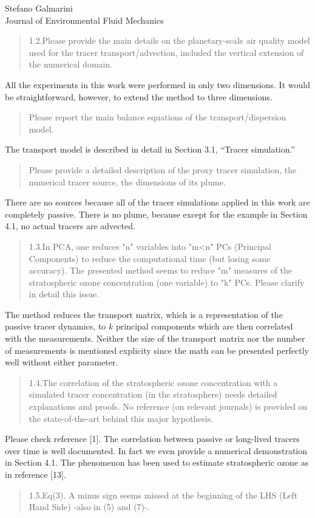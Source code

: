 \documentclass{letter}
\begin{document}
\begin{letter}{Stefano Galmarini\\
Journal of Environmental Fluid Mechanics}
\begin{quote}
1.2.Please provide the main details on the planetary-scale air quality model used for the tracer transport/advection, included the vertical extension of the numerical domain.
\end{quote}
All the experiments in this work were performed in only two dimensions.
It would be straightforward, however, to extend the method to three dimensions.
\begin{quote}
Please report the main balance equations of the transport/dispersion model.
\end{quote}
The transport model is described in detail in Section 3.1, ``Tracer simulation.''
\begin{quote}
Please provide a detailed description of the proxy tracer simulation, the numerical tracer source, the dimensions of its plume.
\end{quote}
There are no sources because all of the tracer simulations applied in this
work are completely passive. There is no plume, because except for the example
in Section 4.1, no actual tracers are advected.
\begin{quote}
1.3.In PCA, one reduces "n" variables into "m<n" PCs (Principal Components) to reduce the computational time (but losing some accuracy). The presented method seems to reduce "m" measures of the stratospheric ozone concentration (one variable) to "k" PCs. Please clarify in detail this issue.
\end{quote}
The method reduces the transport matrix, which is a representation of the passive
tracer dynamics, to $k$ principal components which are then correlated with the
measurements.
Neither the size of the transport matrix nor the number of measurements is
mentioned explicity since the math can be presented perfectly well without 
either parameter.
\begin{quote}
1.4.The correlation of the stratospheric ozone concentration with a simulated tracer concentration (in the stratosphere) needs detailed explanations and proofs. No reference (on relevant journals) is provided on the state-of-the-art behind this major hypothesis.
\end{quote}
Please check reference [1]. The correlation between passive or long-lived tracers over time is well documented. In fact we even provide a numerical demonstration in Section 4.1. The phenomenon has been used to estimate stratospheric ozone as in reference [13].
\begin{quote}
1.5.Eq(3). A minus sign seems missed at the beginning of the LHS (Left Hand Side) -also in (5) and (7)-.

\end{quote}
\end{letter}
\end{document}
